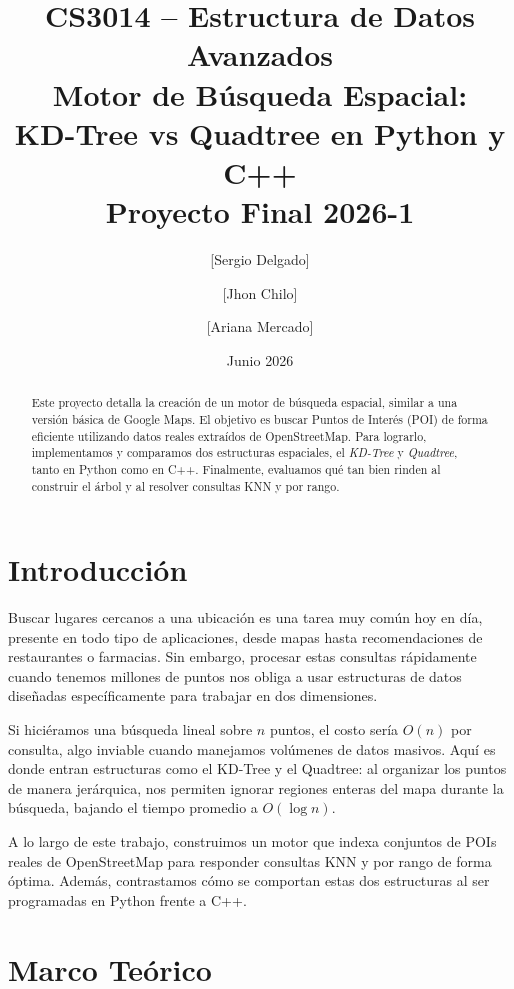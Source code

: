 \documentclass[11pt, a4paper]{article}
\title{
    \vspace{-1cm}
    {\large CS3014 – Estructura de Datos Avanzados} \\[0.5em]
    {\Large \textbf{Motor de Búsqueda Espacial:}} \\[0.3em]
    {\Large KD-Tree vs Quadtree en Python y C++} \\[0.5em]
    {\normalsize Proyecto Final 2026-1}
}
\author{
    [Sergio Delgado] \and
    [Jhon Chilo] \and
    [Ariana Mercado] 
}
\date{Junio 2026}
\begin{document}
\maketitle
\thispagestyle{fancy}

\begin{abstract}
Este proyecto detalla la creación de un motor de búsqueda espacial, similar a una 
versión básica de Google Maps. El objetivo es buscar Puntos de Interés (POI) de 
forma eficiente utilizando datos reales extraídos de OpenStreetMap. Para lograrlo, 
implementamos y comparamos dos estructuras espaciales, el \textit{KD-Tree} y \textit{Quadtree}, tanto 
en Python como en C++. Finalmente, evaluamos qué tan bien rinden al construir el árbol y al 
resolver consultas KNN y por rango.
\end{abstract}

\section{Introducción}

Buscar lugares cercanos a una ubicación es una tarea muy común hoy en día, presente en todo tipo de aplicaciones, desde mapas hasta recomendaciones de restaurantes o farmacias. Sin embargo, procesar estas consultas rápidamente cuando tenemos millones de puntos nos obliga a usar estructuras de datos diseñadas específicamente para trabajar en dos dimensiones.

Si hiciéramos una búsqueda lineal sobre $n$ puntos, el costo sería $O(n)$ por consulta,
algo inviable cuando manejamos volúmenes de datos masivos. Aquí es donde entran estructuras como el KD-Tree y el Quadtree: al organizar los puntos de manera jerárquica, nos permiten ignorar regiones enteras del mapa durante la búsqueda, bajando el tiempo promedio a $O(\log n)$.

A lo largo de este trabajo, construimos un motor que indexa conjuntos de POIs reales de OpenStreetMap para responder consultas KNN y por rango de forma óptima. Además, contrastamos cómo se comportan estas dos estructuras al ser programadas en Python frente a C++.

\section{Marco Teórico}
\label{sec:marco}
\end{document}
